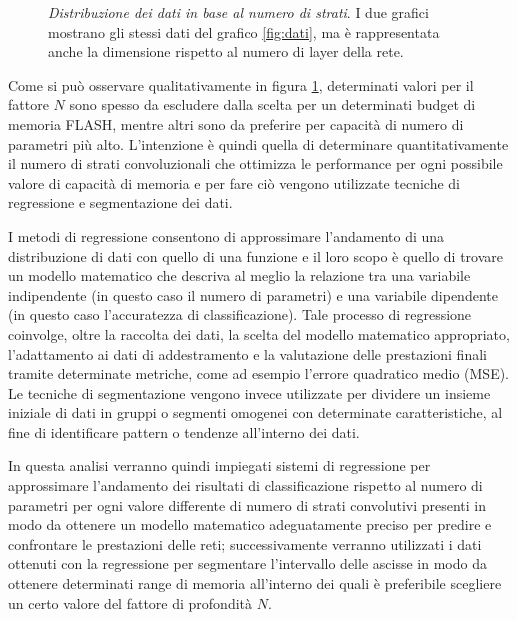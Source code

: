 \begin{figure}[ht]
    \centering
    \quad
    \quad
    \caption{\textit{Distribuzione dei dati in base al numero di strati}. I due grafici mostrano gli stessi dati del grafico \ref{fig:dati}, ma è rappresentata anche la dimensione rispetto al numero di layer della rete.}
    \label{fig:dati_layer}
\end{figure}

Come si può osservare qualitativamente in figura \ref{fig:dati_layer}, determinati valori per il fattore $N$ sono spesso da escludere dalla scelta per un determinati budget di memoria FLASH, mentre altri sono da preferire per capacità di numero di parametri più alto. L'intenzione è quindi quella di determinare quantitativamente il numero di strati convoluzionali che ottimizza le performance per ogni possibile valore di capacità di memoria e per fare ciò vengono utilizzate tecniche di regressione e segmentazione dei dati.

I metodi di regressione consentono di approssimare l'andamento di una distribuzione di dati con quello di una funzione e il loro scopo è quello di trovare un modello matematico che descriva al meglio la relazione tra una variabile indipendente (in questo caso il numero di parametri) e una variabile dipendente (in questo caso l'accuratezza di classificazione). Tale processo di regressione coinvolge, oltre la raccolta dei dati, la scelta del modello matematico appropriato, l'adattamento ai dati 
di addestramento e la valutazione delle prestazioni finali tramite determinate metriche, come ad esempio l'errore quadratico medio (MSE).
Le tecniche di segmentazione vengono invece utilizzate per dividere un insieme iniziale di dati in gruppi o segmenti omogenei con determinate caratteristiche, al fine di identificare pattern o tendenze all'interno dei dati.

In questa analisi verranno quindi impiegati sistemi di regressione per approssimare l'andamento dei risultati di classificazione rispetto al numero di parametri per ogni valore differente di numero di strati convolutivi presenti in modo da ottenere un modello matematico adeguatamente preciso per predire e confrontare le prestazioni delle reti; successivamente verranno utilizzati i dati ottenuti con la regressione per segmentare l'intervallo delle ascisse in modo da ottenere determinati range di memoria all'interno dei quali è preferibile scegliere un certo valore del fattore di profondità $N$.

